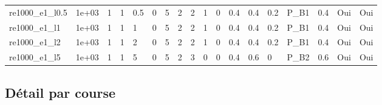 \documentclass[11pt,a4paper]{article}
\begin{document}
\begin{landscape}
\begin{longtable}{*{18}{l}}
    re1000\_e1\_l0.5 & 1e+03 & 1 & 1 & 0.5 & 0 & 5 & 2 & 2 & 1 & 0 & 0.4 & 0.4 & 0.2 & P\_B1 & 0.4 & Oui & Oui \\
    re1000\_e1\_l1 & 1e+03 & 1 & 1 & 1 & 0 & 5 & 2 & 2 & 1 & 0 & 0.4 & 0.4 & 0.2 & P\_B1 & 0.4 & Oui & Oui \\
    re1000\_e1\_l2 & 1e+03 & 1 & 1 & 2 & 0 & 5 & 2 & 2 & 1 & 0 & 0.4 & 0.4 & 0.2 & P\_B1 & 0.4 & Oui & Oui \\
    re1000\_e1\_l5 & 1e+03 & 1 & 1 & 5 & 0 & 5 & 2 & 3 & 0 & 0 & 0.4 & 0.6 & 0 & P\_B2 & 0.6 & Oui & Oui \\
    \end{longtable}
\endgroup
\end{landscape}


\subsection{Détail par course}
\end{document}
